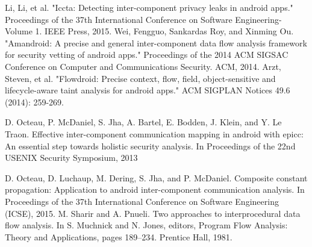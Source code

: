 \documentclass[journal]{IEEEtran}
\begin{document}
\newpage
\begin{thebibliography}{1}

Li, Li, et al. "Iccta: Detecting inter-component privacy leaks in android apps." Proceedings of the 37th International Conference on Software Engineering-Volume 1. IEEE Press, 2015.
Wei, Fengguo, Sankardas Roy, and Xinming Ou. "Amandroid: A precise and general inter-component data flow analysis framework for security vetting of android apps." Proceedings of the 2014 ACM SIGSAC Conference on Computer and Communications Security. ACM, 2014.
Arzt, Steven, et al. "Flowdroid: Precise context, flow, field, object-sensitive and lifecycle-aware taint analysis for android apps." ACM SIGPLAN Notices 49.6 (2014): 259-269.

 D. Octeau, P. McDaniel, S. Jha, A. Bartel, E. Bodden, J. Klein, and
Y. Le Traon. Effective inter-component communication mapping in
android with epicc: An essential step towards holistic security analysis.
In Proceedings of the 22nd USENIX Security Symposium, 2013
 
D. Octeau, D. Luchaup, M. Dering, S. Jha, and P. McDaniel. Composite
constant propagation: Application to android inter-component communication
analysis. In Proceedings of the 37th International Conference
on Software Engineering (ICSE), 2015.
M. Sharir and A. Pnueli. Two approaches to interprocedural data
flow analysis. In S. Muchnick and N. Jones, editors, Program Flow
Analysis: Theory and Applications, pages 189–234. Prentice Hall,
1981.
\end{thebibliography}








\end{document}
